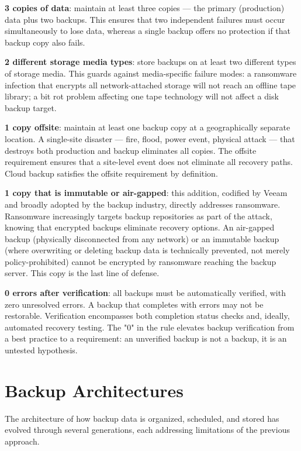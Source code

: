 \textbf{3 copies of data}: maintain at least three copies --- the primary (production) data plus two backups. This ensures that two independent failures must occur simultaneously to lose data, whereas a single backup offers no protection if that backup copy also fails.

\textbf{2 different storage media types}: store backups on at least two different types of storage media. This guards against media-specific failure modes: a ransomware infection that encrypts all network-attached storage will not reach an offline tape library; a bit rot problem affecting one tape technology will not affect a disk backup target.

\textbf{1 copy offsite}: maintain at least one backup copy at a geographically separate location. A single-site disaster --- fire, flood, power event, physical attack --- that destroys both production and backup eliminates all copies. The offsite requirement ensures that a site-level event does not eliminate all recovery paths. Cloud backup satisfies the offsite requirement by definition.

\textbf{1 copy that is immutable or air-gapped}: this addition, codified by Veeam and broadly adopted by the backup industry, directly addresses ransomware. Ransomware increasingly targets backup repositories as part of the attack, knowing that encrypted backups eliminate recovery options. An air-gapped backup (physically disconnected from any network) or an immutable backup (where overwriting or deleting backup data is technically prevented, not merely policy-prohibited) cannot be encrypted by ransomware reaching the backup server. This copy is the last line of defense.

\textbf{0 errors after verification}: all backups must be automatically verified, with zero unresolved errors. A backup that completes with errors may not be restorable. Verification encompasses both completion status checks and, ideally, automated recovery testing. The "0" in the rule elevates backup verification from a best practice to a requirement: an unverified backup is not a backup, it is an untested hypothesis.

\section{Backup Architectures}
The architecture of how backup data is organized, scheduled, and stored has evolved through several generations, each addressing limitations of the previous approach.

